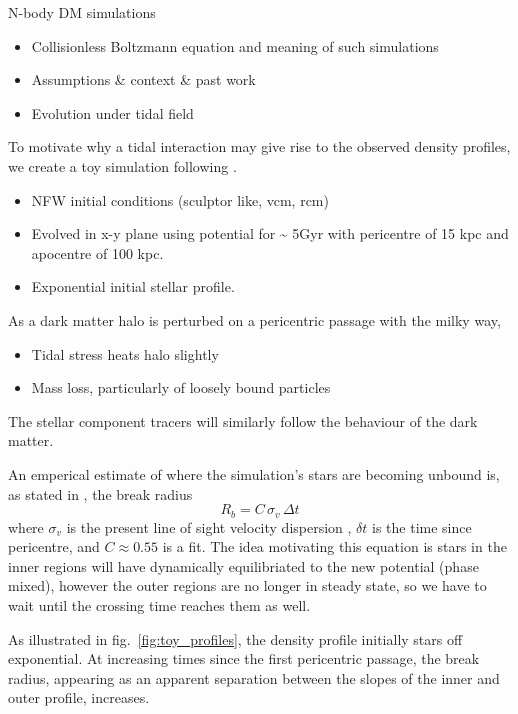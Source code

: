 N-body DM simulations

\begin{itemize}
\tightlist
\item
  Collisionless Boltzmann equation and meaning of such simulations
\item
  Assumptions \& context \& past work
\item
  Evolution under tidal field
\end{itemize}

To motivate why a tidal interaction may give rise to the observed
density profiles, we create a toy simulation following \citet{PNM2008}.

\begin{itemize}
\item
  NFW initial conditions (sculptor like, vcm, rcm)
\item
  Evolved in x-y plane using \citet{EP2020} potential for
  \textasciitilde{} 5Gyr with pericentre of 15 kpc and apocentre of 100
  kpc.
\item
  Exponential initial stellar profile.
\end{itemize}

As a dark matter halo is perturbed on a pericentric passage with the
milky way,

\begin{itemize}
\tightlist
\item
  Tidal stress heats halo slightly
\item
  Mass loss, particularly of loosely bound particles
\end{itemize}

The stellar component tracers will similarly follow the behaviour of the
dark matter.

An emperical estimate of where the simulation's stars are becoming
unbound is, as stated in \citet{PNM2008}, the break radius \[
R_b = C\,\sigma_{v}\,\Delta t
\] where \(\sigma_v\) is the present line of sight velocity dispersion ,
\(\delta t\) is the time since pericentre, and \(C \approx 0.55\) is a
fit. The idea motivating this equation is stars in the inner regions
will have dynamically equilibriated to the new potential (phase mixed),
however the outer regions are no longer in steady state, so we have to
wait until the crossing time reaches them as well.

As illustrated in fig.~\ref{fig:toy_profiles}, the density profile
initially stars off exponential. At increasing times since the first
pericentric passage, the break radius, appearing as an apparent
separation between the slopes of the inner and outer profile, increases.

